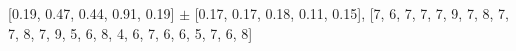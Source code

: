 
[0.19, 0.47, 0.44, 0.91, 0.19] $\pm$ [0.17, 0.17, 0.18, 0.11, 0.15], [7, 6, 7, 7, 7, 9, 7, 8, 7, 7, 8, 7, 9, 5, 6, 8, 4, 6, 7, 6, 6, 5, 7, 6, 8]\\
